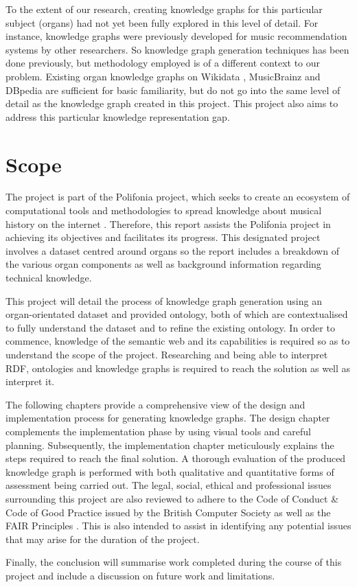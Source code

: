 To the extent of our research, creating knowledge graphs for this particular subject (organs) had not yet been fully explored in this level of detail. For instance, knowledge graphs were previously developed for music recommendation systems \cite{oramas2016sound} by other researchers. So knowledge graph generation techniques has been done previously, but methodology employed is of a different context to our problem. Existing organ knowledge graphs on Wikidata \cite{organwikidata}, MusicBrainz \cite{organmusicbrainz} and DBpedia \cite{organdbpedia} are sufficient for basic familiarity, but do not go into the same level of detail as the knowledge graph created in this project. This project also aims to address this particular knowledge representation gap. 

\section{Scope}
The project is part of the Polifonia project, which seeks to create an ecosystem of computational tools and methodologies to spread knowledge about musical history on the internet \cite{polifoniaproject}. Therefore, this report assists the Polifonia project in achieving its objectives and facilitates its progress. This designated project involves a dataset centred around organs so the report includes a breakdown of the various organ components as well as background information regarding technical knowledge. 

This project will detail the process of knowledge graph generation using an organ-orientated dataset and provided ontology, both of which are contextualised to fully understand the dataset and to refine the existing ontology. In order to commence, knowledge of the semantic web and its capabilities is required so as to understand the scope of the project. Researching and being able to interpret RDF, ontologies and knowledge graphs is required to reach the solution as well as interpret it. 

The following chapters provide a comprehensive view of the design and implementation process for generating knowledge graphs. The design chapter complements the implementation phase by using visual tools and careful planning. Subsequently, the implementation chapter meticulously explains the steps required to reach the final solution. A thorough evaluation of the produced knowledge graph is performed with both qualitative and quantitative forms of assessment being carried out. The legal, social, ethical and professional issues surrounding this project are also reviewed to adhere to the Code of Conduct \& Code of Good Practice issued by the British Computer Society \cite{bcs} as well as the FAIR Principles \cite{fairprinciples}. This is also intended to assist in identifying any potential issues that may arise for the duration of the project.

Finally, the conclusion will summarise work completed during the course of this project and include a discussion on future work and limitations. 
